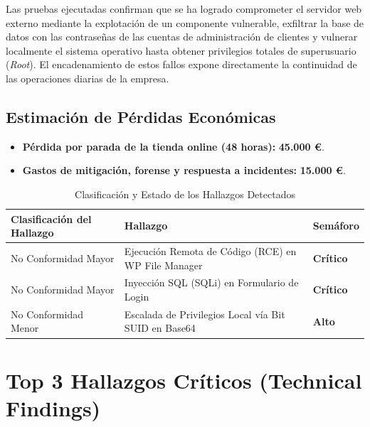\documentclass[11pt,a4paper]{report}
\begin{document}
Las pruebas ejecutadas confirman que se ha logrado comprometer el servidor web externo mediante la explotación de un componente vulnerable, exfiltrar la base de datos con las contraseñas de las cuentas de administración de clientes y vulnerar localmente el sistema operativo hasta obtener privilegios totales de superusuario (\textit{Root}). El encadenamiento de estos fallos expone directamente la continuidad de las operaciones diarias de la empresa.

\section*{Estimación de Pérdidas Económicas}
\begin{itemize}
    \item \textbf{Pérdida por parada de la tienda online (48 horas):} \textbf{45.000 €}.
    \item \textbf{Gastos de mitigación, forense y respuesta a incidentes:} \textbf{15.000 €}.
\end{itemize}

\vspace{0.6cm}
\begin{table}[h]
    \centering
    \caption{Clasificación y Estado de los Hallazgos Detectados}
    \begin{tabular}{m{4.5cm}m{6.5cm}l}
        \toprule
        \textbf{Clasificación del Hallazgo} & \textbf{Hallazgo} & \textbf{Semáforo} \\
        \midrule
        No Conformidad Mayor & Ejecución Remota de Código (RCE) en WP File Manager & \color{critred}\textbf{Crítico}\color{black} \\
        No Conformidad Mayor & Inyección SQL (SQLi) en Formulario de Login & \color{critred}\textbf{Crítico}\color{black} \\
        No Conformidad Menor & Escalada de Privilegios Local vía Bit SUID en Base64 & \color{warnorange}\textbf{Alto}\color{black} \\
        \bottomrule
    \end{tabular}
\end{table}

\newpage

\chapter{Top 3 Hallazgos Críticos (Technical Findings)}
\end{document}
